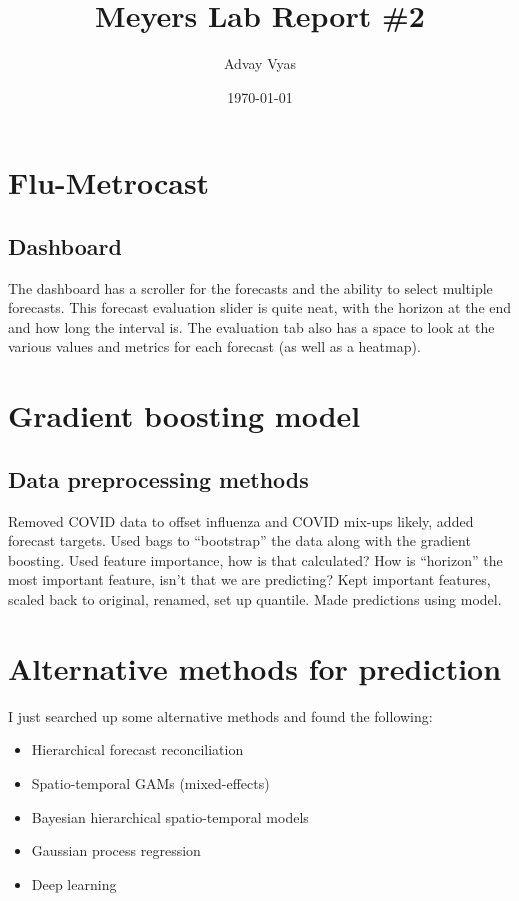\documentclass[12pt]{article}
\title{Meyers Lab Report \#2}
\author{Advay Vyas}
\date{\today}
\begin{document}
\maketitle

\tableofcontents


\section{Flu-Metrocast}


\subsection{Dashboard}
The dashboard has a scroller for the forecasts and the ability to select multiple forecasts. This forecast evaluation slider is quite neat, with the horizon at the end and how long the interval is. The evaluation tab also has a space to look at the various values and metrics for each forecast (as well as a heatmap). 

\section{Gradient boosting model}
\subsection{Data preprocessing methods}
Removed COVID data to offset influenza and COVID mix-ups likely, added forecast targets. Used bags to ``bootstrap'' the data along with the gradient boosting. Used feature importance, how is that calculated? How is ``horizon'' the most important feature, isn't that we are predicting? Kept important features, scaled back to original, renamed, set up quantile. Made predictions using model.


\section{Alternative methods for prediction}
I just searched up some alternative methods and found the following:
\begin{itemize}
    \item Hierarchical forecast reconciliation
    \item Spatio-temporal GAMs (mixed-effects)
    \item Bayesian hierarchical spatio-temporal models
    \item Gaussian process regression
    \item Deep learning
\end{itemize}
\end{document}
